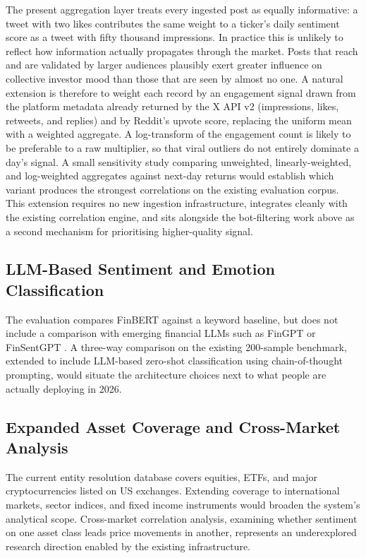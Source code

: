 The present aggregation layer treats every ingested post as equally informative: a tweet with two likes contributes the same weight to a ticker's daily sentiment score as a tweet with fifty thousand impressions. In practice this is unlikely to reflect how information actually propagates through the market. Posts that reach and are validated by larger audiences plausibly exert greater influence on collective investor mood than those that are seen by almost no one. A natural extension is therefore to weight each record by an engagement signal drawn from the platform metadata already returned by the X API v2 (impressions, likes, retweets, and replies) and by Reddit's upvote score, replacing the uniform mean with a weighted aggregate. A log-transform of the engagement count is likely to be preferable to a raw multiplier, so that viral outliers do not entirely dominate a day's signal. A small sensitivity study comparing unweighted, linearly-weighted, and log-weighted aggregates against next-day returns would establish which variant produces the strongest correlations on the existing evaluation corpus. This extension requires no new ingestion infrastructure, integrates cleanly with the existing correlation engine, and sits alongside the bot-filtering work above as a second mechanism for prioritising higher-quality signal.

\subsection{LLM-Based Sentiment and Emotion Classification}

The evaluation compares FinBERT against a keyword baseline, but does not include a comparison with emerging financial LLMs such as FinGPT \citep{weng2023fingpt} or FinSentGPT \citep{mahda2024finsentgpt}.  A three-way comparison on the existing 200-sample benchmark, extended to include LLM-based zero-shot classification using chain-of-thought prompting, would situate the architecture choices next to what people are actually deploying in 2026.

\subsection{Expanded Asset Coverage and Cross-Market Analysis}

The current entity resolution database covers equities, ETFs, and major cryptocurrencies listed on US exchanges.  Extending coverage to international markets, sector indices, and fixed income instruments would broaden the system's analytical scope.  Cross-market correlation analysis, examining whether sentiment on one asset class leads price movements in another, represents an underexplored research direction enabled by the existing infrastructure.

